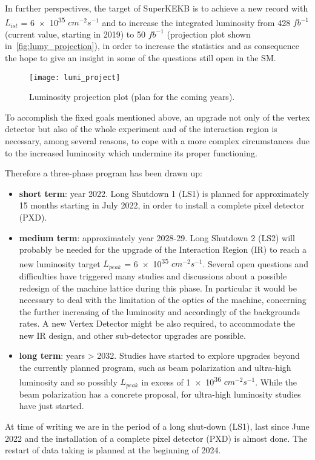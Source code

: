 In further perspectives, the target of SuperKEKB is to achieve a new record with \textit{$L_{ist}$} = \num{6e35} $cm^{-2}s^{-1}$ and to increase the integrated luminosity from 428 $fb^{-1}$ (current value, starting in 2019) to 50 $fb^{-1}$ (projection plot shown in~\autoref{fig:lumy_projection}), in order to increase the statistics and as consequence the hope to give an insight in some of the questions still open in the SM.\\

\begin{figure}
\centering
\texttt{[image: lumi\_project]}
\caption{Luminosity projection plot (plan for the coming years).}
\label{fig:lumy_projection}
\end{figure}

To accomplish the fixed goals mentioned above, an upgrade not only of the vertex detector but also of the whole experiment and of the interaction region is necessary, among several reasons, to cope with a more complex circumstances due to the increased luminosity which undermine its proper functioning.

Therefore a three-phase program has been drawn up:

\begin{itemize}
\item \textbf{short term}: year 2022. Long Shutdown 1 (LS1) is planned for approximately 15 months starting in July 2022, in order to install a complete pixel detector (PXD).
\item \textbf{medium term}: approximately year 2028-29. Long Shutdown 2 (LS2) will probably be needed for the upgrade of the Interaction Region (IR) to reach a new luminosity target $\textit{L}_{peak}$ = \num{6e35} $cm^{-2}s^{-1}$. 
Several open questions and difficulties have triggered many studies and discussions about a possible redesign of the machine lattice during this phase. In particular it would be necessary to deal with the limitation of the optics of the machine, concerning the further increasing of the luminosity and accordingly of the backgrounds rates. A new Vertex Detector might be also required, to accommodate the new IR design, and other sub-detector upgrades are possible. 
\item \textbf{long term}: years > 2032. Studies have started to explore upgrades beyond the currently planned program, such as beam polarization and ultra-high luminosity and so possibly $\textit{L}_{peak}$ in excess of \num{1e36} $cm^{-2}s^{-1}$. While the beam polarization has a concrete proposal, for ultra-high luminosity studies have just started.
\end{itemize}

At time of writing we are in the period of a long shut-down (LS1), last since June 2022 and the installation of a complete pixel detector (PXD) is almost done. The restart of data taking is planned at the beginning of 2024.

